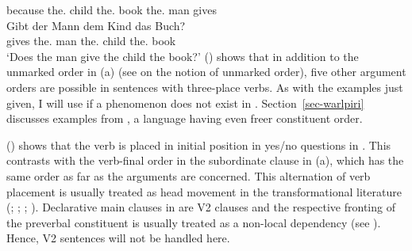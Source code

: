 \documentclass[output=paper,biblatex,babelshorthands,newtxmath,draftmode,colorlinks,citecolor=brown]{langscibook}
\begin{document}
     \spacebr{}because the.\DAT{} child the.\ACC{} book the.\NOM{} man  gives\\
\zl
\ea
\gll Gibt der Mann dem Kind das Buch?\\
     gives the.\NOM{} man the.\DAT{} child the.\ACC{} book\\
\glt `Does the man give the child the book?'
\z
() shows that in addition to the unmarked order in (a) (see  on the
notion of unmarked order), five other argument orders are possible in sentences with three-place
verbs. As with the examples just given, I will use  if a phenomenon does not exist in
. Section~\ref{sec-warlpiri} discusses examples from , a language having even freer constituent order.

() shows that the verb is placed in initial position in yes/no questions in . This contrasts
with the verb-final order in the subordinate clause in (a), which has the same order as far
as the arguments are concerned. This alternation of verb placement is usually treated as
head movement in the transformational literature (\citealp{Bach62a}; \citealp*[]{Bierwisch63a};
\citealp{Reis74a}; \citealp[Chapter~1]{Thiersch78a}). Declarative main clauses in  are
V2
clauses and the respective fronting of the preverbal constituent is usually treated as a non-local dependency (see
). Hence, V2 sentences will not be handled here.
\end{document}
